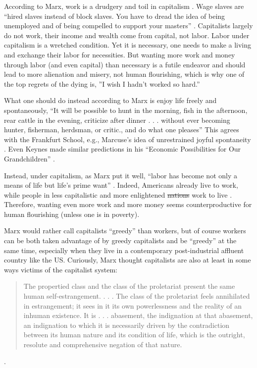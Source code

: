 \documentclass[10pt, letterpaper]{article}
\providecommand{\DIFaddtex}[1]{{\protect\color{blue}\uwave{#1}}} %
\providecommand{\DIFdeltex}[1]{{\protect\color{red}\sout{#1}}}                      %
\providecommand{\DIFaddbegin}{} %
\providecommand{\DIFaddend}{} %
\providecommand{\DIFdelbegin}{} %
\providecommand{\DIFdelend}{} %
\providecommand{\DIFadd}[1]{\texorpdfstring{\DIFaddtex{#1}}{#1}} %
\providecommand{\DIFdel}[1]{\texorpdfstring{\DIFdeltex{#1}}{}} %
\newcommand{\DIFscaledelfig}{0.5}
\newlength{\DIFdelgraphicswidth} %
\newlength{\DIFdelgraphicsheight} %
\newcommand{\DIFaddincludegraphics}[2][]{{\color{blue}\fbox{\DIFOincludegraphics[#1]{#2}}}} %
\newcommand{\DIFdelincludegraphics}[2][]{%
\sbox{\DIFdelgraphicsbox}{\DIFOincludegraphics[#1]{#2}}%
\settoboxwidth{\DIFdelgraphicswidth}{\DIFdelgraphicsbox} %
\settoboxtotalheight{\DIFdelgraphicsheight}{\DIFdelgraphicsbox} %
\scalebox{\DIFscaledelfig}{%
\parbox[b]{\DIFdelgraphicswidth}{\usebox{\DIFdelgraphicsbox}\\[-\baselineskip] \rule{\DIFdelgraphicswidth}{0em}}\llap{\resizebox{\DIFdelgraphicswidth}{\DIFdelgraphicsheight}{%
\setlength{\unitlength}{\DIFdelgraphicswidth}%
\begin{picture}(1,1)%
\thicklines\linethickness{2pt} %
{\color[rgb]{1,0,0}\put(0,0){\framebox(1,1){}}}%
{\color[rgb]{1,0,0}\put(0,0){\line( 1,1){1}}}%
{\color[rgb]{1,0,0}\put(0,1){\line(1,-1){1}}}%
\end{picture}%
}\hspace*{3pt}}} %
} %
\DeclareRobustCommand{\DIFaddbegin}{\DIFOaddbegin \let\includegraphics\DIFaddincludegraphics} %
\DeclareRobustCommand{\DIFaddend}{\DIFOaddend \let\includegraphics\DIFOincludegraphics} %
\DeclareRobustCommand{\DIFdelbegin}{\DIFOdelbegin \let\includegraphics\DIFdelincludegraphics} %
\DeclareRobustCommand{\DIFdelend}{\DIFOaddend \let\includegraphics\DIFOincludegraphics} %
\begin{document}
\begin{spacing}{1.8}
According to Marx, work is a drudgery and toil in capitalism \citep{marx10, lyons07}.
%
%
Wage slaves are ``hired slaves instead of block slaves. You have to dread the idea of being unemployed and of being compelled to support your masters'' \citep[p. 283][]{goldman03}.
% 
Capitalists largely do not work, their income and
wealth come from capital, not labor. %
Labor under capitalism is a wretched condition. Yet it is necessary, one needs
to make a living and exchange their labor for necessities. But wanting more work
and money through labor (and even capital) than necessary is a futile endeavor and should lead to
more alienation and misery, not human flourishing, which is why one of the top regrets of the dying is, ''I wish I hadn't worked so hard.''

What one should do instead according to Marx is enjoy life freely and spontaneously, ``It will be possible to hunt in the morning, fish in the afternoon, rear cattle in the evening, criticize after dinner . . . without ever becoming hunter, fisherman, herdsman, or critic., and do what one pleases''
%
This agrees with the Frankfurt School, e.g., Marcuse's idea of unrestrained joyful spontaneity \citep{marcuse15}. Even Keynes made similar predictions in his ``Economic Possibilities for Our Grandchildren'' \citep{keynes30}.

Instead, under capitalism, as Marx put it  well, ``labor has become not only a
means of life but life's prime want'' \citep[cited in][p. 91]{struhl16}. Indeed,
Americans already live to work, while people in less capitalistic and more
enlightened \DIFdelbegin \DIFdel{nations }\DIFdelend \DIFaddbegin \DIFadd{societies }\DIFaddend work to live \citep{aokditella}. Therefore, wanting even more work and more money seems counterproductive for human flourishing (unless one is in poverty). 

Marx would rather call capitalists ``greedy'' than workers, but of course
workers can be both taken advantage of by greedy capitalists and be ``greedy'' at the same time, especially when they live in a contemporary post-industrial affluent country like the US.
Curiously, Marx thought capitalists are also at least in some ways victims of the capitalist system:
\begin{quote}
  The propertied class and the class of the proletariat present the same human
  self-estrangement. . . . The class of the proletariat feels annihilated in
  estrangement; it sees in it its own powerlessness and the reality of an
  inhuman existence. It is . . . abasement, the indignation at that abasement,
  an indignation to which it is necessarily driven by the contradiction between
  its human nature and its condition of life, which is the outright, resolute
  and comprehensive negation of that nature.
\end{quote} \citep[cited in][p 381]{byron16}.


\end{spacing}
\end{document}
